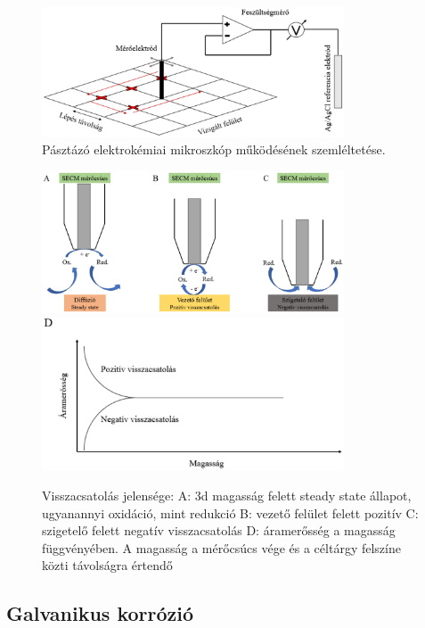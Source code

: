 \begin{figure}
\centering
\includegraphics[width=0.8\textwidth]{img/spm.eps}
\caption{Pásztázó elektrokémiai mikroszkóp működésének szemléltetése.}
\label{fig:PEKM}
\end{figure}

\begin{figure}
\centering
\includegraphics[width=0.8\textwidth]{img/feedback.eps}
\includegraphics[width=0.8\textwidth]{img/feedback2.eps}
\caption{Visszacsatolás jelensége:
A: 3d magasság felett steady state állapot, ugyanannyi oxidáció, mint redukció
B: vezető felület felett pozitív
C: szigetelő felett negatív visszacsatolás
D: áramerősség a magasság függvényében. A magasság a mérőcsúcs vége és a céltárgy felszíne közti távolságra értendő}
\label{fig:feedback}
\end{figure}

\subsection{Galvanikus korrózió}


